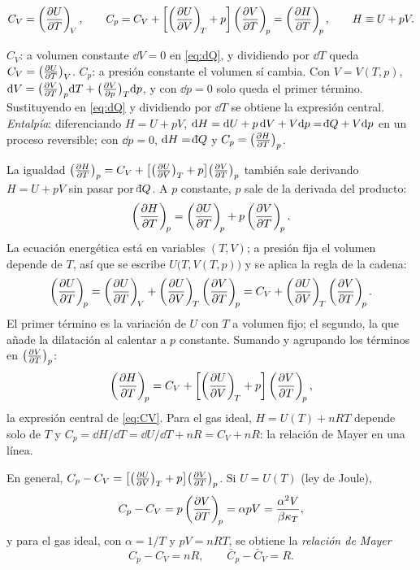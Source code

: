 \begin{proposicion}[$C_V$ y $C_p$ a partir de $U$]
\begin{equation}\label{eq:CV}
  C_V=\left(\frac{\partial U}{\partial T}\right)_{\!V},\qquad
  C_p=C_V+\left[\left(\frac{\partial U}{\partial V}\right)_{\!T}+p\right]\left(\frac{\partial V}{\partial T}\right)_{\!p}=\left(\frac{\partial H}{\partial T}\right)_{\!p},\qquad H\equiv U+pV .
\end{equation}
\end{proposicion}

\begin{demostracion}
\emph{$C_V$}: a volumen constante $\dd V=0$ en \eqref{eq:dQ}, y dividiendo por $\dd T$ queda
$C_V=\bigl(\tfrac{\partial U}{\partial T}\bigr)_{V}$.
\emph{$C_p$}: a presión constante el volumen sí cambia. Con $V=V(T,p)$,
$\mathrm{d} V=\bigl(\tfrac{\partial V}{\partial T}\bigr)_{p}\mathrm{d} T+\bigl(\tfrac{\partial V}{\partial p}\bigr)_{T}\mathrm{d} p$, y con $\dd p=0$ solo queda el primer término. Sustituyendo en
\eqref{eq:dQ} y dividiendo por $\dd T$ se obtiene la expresión central.
\emph{Entalpía}: diferenciando $H=U+pV$, $\dd H=\dd U+p\,\dd V+V\dd p=\dbar Q+V\dd p$ en un proceso reversible;
con $\dd p=0$, $\dd H=\dbar Q$ y $C_p=\bigl(\tfrac{\partial H}{\partial T}\bigr)_{p}$.
\end{demostracion}

\begin{observacion}
La igualdad $\bigl(\tfrac{\partial H}{\partial T}\bigr)_{p}=C_V+\bigl[\bigl(\tfrac{\partial U}{\partial V}\bigr)_{T}+p\bigr]\bigl(\tfrac{\partial V}{\partial T}\bigr)_{p}$ también sale derivando $H=U+pV$ sin pasar por
$\dbar Q$. A $p$ constante, $p$ sale de la derivada del producto:
\[
  \left(\frac{\partial H}{\partial T}\right)_{\!p}=\left(\frac{\partial U}{\partial T}\right)_{\!p}+p\left(\frac{\partial V}{\partial T}\right)_{\!p} .
\]
La ecuación energética está en variables $(T,V)$; a presión fija el volumen depende de $T$, así que se
escribe $U\bigl(T,V(T,p)\bigr)$ y se aplica la regla de la cadena:
\[
  \left(\frac{\partial U}{\partial T}\right)_{\!p}=\left(\frac{\partial U}{\partial T}\right)_{\!V}+\left(\frac{\partial U}{\partial V}\right)_{\!T}\left(\frac{\partial V}{\partial T}\right)_{\!p}=C_V+\left(\frac{\partial U}{\partial V}\right)_{\!T}\left(\frac{\partial V}{\partial T}\right)_{\!p} .
\]
El primer término es la variación de $U$ con $T$ a volumen fijo; el segundo, la que añade la dilatación al
calentar a $p$ constante. Sumando y agrupando los términos en $\bigl(\tfrac{\partial V}{\partial T}\bigr)_{p}$:
\[
  \left(\frac{\partial H}{\partial T}\right)_{\!p}=C_V+\left[\left(\frac{\partial U}{\partial V}\right)_{\!T}+p\right]\left(\frac{\partial V}{\partial T}\right)_{\!p},
\]
la expresión central de \eqref{eq:CV}. Para el gas ideal, $H=U(T)+nRT$ depende solo de $T$ y
$C_p=\dd H/\dd T=\dd U/\dd T+nR=C_V+nR$: la relación de Mayer en una línea.
\end{observacion}

\begin{proposicion}
En general, $C_p-C_V=\bigl[\bigl(\tfrac{\partial U}{\partial V}\bigr)_{T}+p\bigr]\bigl(\tfrac{\partial V}{\partial T}\bigr)_{p}$. Si $U=U(T)$ (ley de Joule),
\begin{equation}\label{eq:CpCV}
  C_p-C_V=p\left(\frac{\partial V}{\partial T}\right)_{\!p}=\alpha pV=\frac{\alpha^2V}{\beta\kappa_T},
\end{equation}
y para el gas ideal, con $\alpha=1/T$ y $pV=nRT$, se obtiene la \emph{relación de Mayer}
\begin{equation}\label{eq:mayer}
  C_p-C_V=nR,\qquad \bar C_p-\bar C_V=R .
\end{equation}
\end{proposicion}

